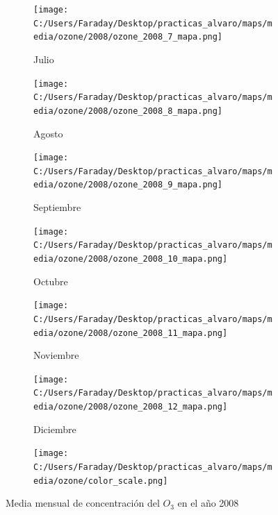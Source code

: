 \documentclass[12pt]{article}
\begin{document}
\begin{figure}[H]
\begin{subfigure}[H]{0.15\textwidth}
\texttt{[image: C:/Users/Faraday/Desktop/practicas\_alvaro/maps/media/ozone/2008/ozone\_2008\_7\_mapa.png]}
\captionsetup{labelformat=empty}
\caption{Julio}
\label{fig:map-ozone-2008-7}
\end{subfigure}
%
\begin{subfigure}[H]{0.15\textwidth}
\texttt{[image: C:/Users/Faraday/Desktop/practicas\_alvaro/maps/media/ozone/2008/ozone\_2008\_8\_mapa.png]}
\captionsetup{labelformat=empty}
\caption{Agosto}
\label{fig:map-ozone-2008-8}
\end{subfigure}
%
\begin{subfigure}[H]{0.15\textwidth}
\texttt{[image: C:/Users/Faraday/Desktop/practicas\_alvaro/maps/media/ozone/2008/ozone\_2008\_9\_mapa.png]}
\captionsetup{labelformat=empty}
\caption{Septiembre}
\label{fig:map-ozone-2008-9}
\end{subfigure}
%
\begin{subfigure}[H]{0.15\textwidth}
\texttt{[image: C:/Users/Faraday/Desktop/practicas\_alvaro/maps/media/ozone/2008/ozone\_2008\_10\_mapa.png]}
\captionsetup{labelformat=empty}
\caption{Octubre}
\label{fig:map-ozone-2008-10}
\end{subfigure}
%
\begin{subfigure}[H]{0.15\textwidth}
\texttt{[image: C:/Users/Faraday/Desktop/practicas\_alvaro/maps/media/ozone/2008/ozone\_2008\_11\_mapa.png]}
\captionsetup{labelformat=empty}
\caption{Noviembre}
\label{fig:map-ozone-2008-11}
\end{subfigure}
%
\begin{subfigure}[H]{0.15\textwidth}
\texttt{[image: C:/Users/Faraday/Desktop/practicas\_alvaro/maps/media/ozone/2008/ozone\_2008\_12\_mapa.png]}
\captionsetup{labelformat=empty}
\caption{Diciembre}
\label{fig:map-ozone-2008-12}
\end{subfigure}

\begin{subfigure}[H]{0.45\textwidth}
\texttt{[image: C:/Users/Faraday/Desktop/practicas\_alvaro/maps/media/ozone/color\_scale.png]}
\captionsetup{labelformat=empty}
\caption{}
\end{subfigure}

\vspace*{-7mm}
\caption{Media mensual de concentración del $O_{3}$ en el año 2008}
\label{fig:map-ozone-2008}
\end{figure}
\end{document}
